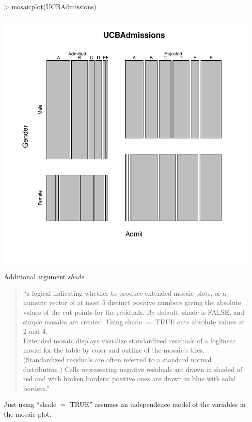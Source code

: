 \documentclass[12pt,letterpaper,final]{article}
\begin{document}
\begin{Schunk}
\begin{Sinput}
> mosaicplot(UCBAdmissions)
\end{Sinput}
\end{Schunk}
\includegraphics{lect_main-040}


Additional argument {\it shade}: 
\begin{quotation}
``a logical indicating whether to produce extended mosaic plots, or a numeric vector of at most 5 distinct positive numbers giving the absolute values of the cut points for the residuals. By default, shade is FALSE, and simple mosaics are created. Using shade $=$ TRUE cuts absolute values at 2 and 4. \\
Extended mosaic displays visualize standardized residuals of a loglinear model for the table by color and outline of the mosaic's tiles. (Standardized residuals are often referred to a standard normal distribution.) Cells representing negative residuals are drawn in shaded of red and with broken borders; positive ones are drawn in blue with solid borders.''
\end{quotation}

Just using ``shade $=$ TRUE'' assumes an independence model of the variables in the mosaic plot.
\end{document}
